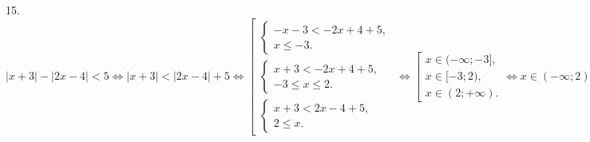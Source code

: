 15. $|x+3|-|2x-4|<5\Leftrightarrow |x+3|<|2x-4|+5 \Leftrightarrow \left[\begin{array}{l}\begin{cases} -x-3<-2x+4+5,\\ x\leqslant -3.\end{cases}\\
\begin{cases} x+3<-2x+4+5,\\ -3\leqslant x\leqslant 2 .\end{cases}\\\begin{cases} x+3<2x-4+5,\\ 2\leqslant x.\end{cases}\end{array}\right.\Leftrightarrow
\left[\begin{array}{l}
x\in(-\infty;-3],\\
x\in[-3;2),\\
x\in(2;+\infty).\end{array}\right.\Leftrightarrow x\in(-\infty;2)\cup(2;+\infty)$\\
